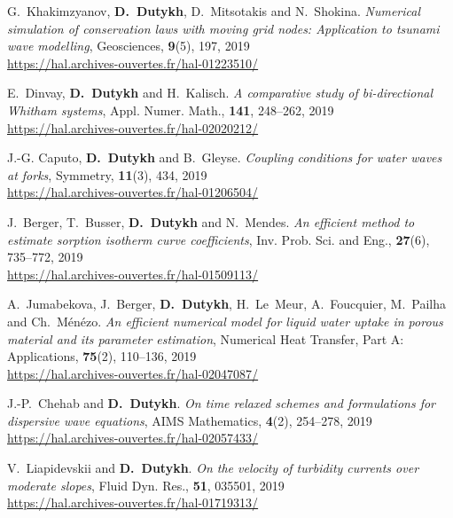\begin{etaremune}
  \item G.~Khakimzyanov, \textbf{D.~Dutykh}, D.~Mitsotakis and N.~Shokina. \textit{Numerical simulation of conservation laws with moving grid nodes: Application to tsunami wave modelling}, Geosciences, \textbf{9}(5), 197, 2019 \\ %
  \url{https://hal.archives-ouvertes.fr/hal-01223510/}

  \item E.~Dinvay, \textbf{D.~Dutykh} and H.~Kalisch. \textit{A comparative study of bi-directional Whitham systems}, Appl. Numer. Math., \textbf{141}, 248--262, 2019 \\ %
  \url{https://hal.archives-ouvertes.fr/hal-02020212/}
  
  \item J.-G. Caputo, \textbf{D.~Dutykh} and B.~Gleyse. \textit{Coupling conditions for water waves at forks}, Symmetry, \textbf{11}(3), 434, 2019 \\ %
  \url{https://hal.archives-ouvertes.fr/hal-01206504/}
  
  \item J.~Berger, T.~Busser, \textbf{D.~Dutykh} and N.~Mendes. \textit{An efficient method to estimate sorption isotherm curve coefficients},  Inv. Prob. Sci. and Eng., \textbf{27}(6), 735--772, 2019 \\ %
  \url{https://hal.archives-ouvertes.fr/hal-01509113/}
  
  \item A.~Jumabekova, J.~Berger, \textbf{D.~Dutykh}, H.~Le~Meur, A.~Foucquier, M.~Pailha and Ch.~M\'en\'ezo. \textit{An efficient numerical model for liquid water uptake in porous material and its parameter estimation}, Numerical Heat Transfer, Part A: Applications, \textbf{75}(2), 110--136, 2019 \\ %
  \url{https://hal.archives-ouvertes.fr/hal-02047087/}
  
  \item J.-P.~Chehab and \textbf{D.~Dutykh}. \textit{On time relaxed schemes and formulations for dispersive wave equations}, AIMS Mathematics, \textbf{4}(2), 254--278, 2019 \\ %
  \url{https://hal.archives-ouvertes.fr/hal-02057433/}
  
  \item V.~Liapidevskii and \textbf{D.~Dutykh}. \textit{On the velocity of turbidity currents over moderate slopes}, Fluid Dyn. Res., \textbf{51}, 035501, 2019 \\ %
  \url{https://hal.archives-ouvertes.fr/hal-01719313/}
  

\end{etaremune}
